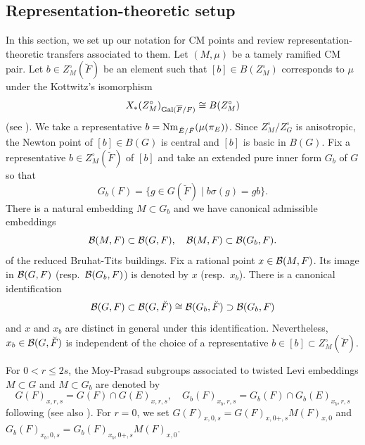 \documentclass[12pt,reqno]{amsart}
\begin{document}
\subsection{Representation-theoretic setup} \label{ssec:representation_theory_preparation}


In this section, we set up our notation for CM points and review representation-theoretic transfers associated to them. Let $(M, \mu)$ be a tamely ramified CM pair. Let $b \in Z^\circ_M(\breve{F})$ be an element such that $[b] \in B(Z_M^\circ)$ corresponds to $\mu$ under the Kottwitz's isomorphism 
\[
    X_*(Z_M^\circ)_{{\operatorname{Gal}}({\overline{F}} / F)} \cong B(Z_M^\circ)
\]
(see \cite[{}2.4]{Kot84}). We take a representative $b = {\operatorname{Nm}}_{\breve{E} / \breve{F}}(\mu(\pi_E))$. Since $Z_M^\circ / Z_G^\circ$ is anisotropic, the Newton point of $[b] \in B(G)$ is central and $[b]$ is basic in $B(G)$. Fix a representative $b \in Z_M^\circ(\breve{F})$ of $[b]$ and take an extended pure inner form $G_b$ of $G$ so that 
\[
    G_b(F) = \{ g \in G(\breve{F}) \mid b \sigma(g) = g b \}. 
\]
There is a natural embedding $M \subset G_b$ and we have canonical admissible embeddings 
\[
    {\mathcal{B}}(M, F) \subset {\mathcal{B}}(G, F), \quad {\mathcal{B}}(M, F) \subset {\mathcal{B}}(G_b, F). 
\]
of the reduced Bruhat-Tits buildings. Fix a rational point $x \in {\mathcal{B}}(M, F)$. Its image in ${\mathcal{B}}(G, F)$ (resp.\ ${\mathcal{B}}(G_b, F)$) is denoted by $x$ (resp.\ $x_b$). There is a canonical identification 
\[
    {\mathcal{B}}(G, F) \subset {\mathcal{B}}(G, \breve{F}) \cong {\mathcal{B}}(G_b, \breve{F}) \supset {\mathcal{B}}(G_b, F)
\]
and $x$ and $x_b$ are distinct in general under this identification. Nevertheless, $x_b \in {\mathcal{B}}(G, \breve{F})$ is independent of the choice of a representative $b \in [b] \subset Z_M^\circ(\breve{F})$. 

For $0 < r \leq 2s$, the Moy-Prasad subgroups associated to twisted Levi embeddings $M \subset G$ and $M \subset G_b$ are denoted by
\[ 
    G(F)_{x, r, s} = G(F) \cap G(E)_{x, r, s} ,\quad 
    G_b(F)_{x_b, r, s} = G_b(F) \cap G_b(E)_{x_b, r, s}
\]
following \cite[Section 2.5]{Fin21} (see also \cite[Section 2.2]{Tak26_Yu}). For $r = 0$, we set $G(F)_{x, 0, s} = G(F)_{x, 0+, s} M(F)_{x, 0}$ and $G_b(F)_{x_b, 0, s} = G_b(F)_{x_b, 0+, s} M(F)_{x, 0}$. 
\end{document}
